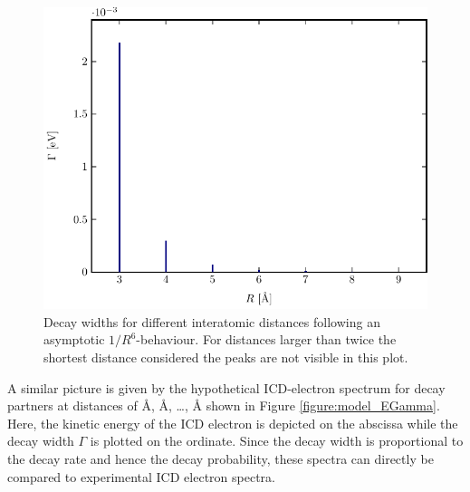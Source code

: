 \begin{figure}[h]
 \centering
 \includegraphics[width=\columnwidth]{pics/model_RGamma.pdf}
 \caption{Decay widths for different interatomic distances following an
          asymptotic $1/R^6$-behaviour. For distances larger than twice
          the shortest distance considered the peaks are not visible in this
          plot.}
 \label{figure:model_RGamma}
\end{figure}

A similar picture is given by the hypothetical ICD-electron spectrum for
decay partners at distances of \unit[3]{\AA}, \unit[4]{\AA}, \dots,
\unit[9]{\AA} shown in Figure \ref{figure:model_EGamma}. Here, the kinetic
energy of the ICD electron is depicted on the abscissa while the decay
width $\Gamma$ is plotted on the ordinate. Since the decay width is proportional
to the decay rate and hence the decay probability, these spectra can directly
be compared to experimental ICD electron spectra.

